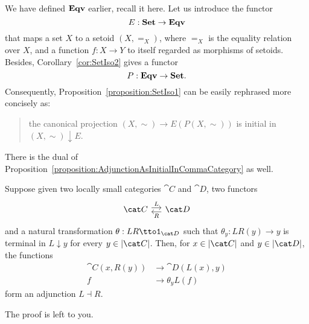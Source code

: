 \begin{example}
We have defined \(\mathbf{Eqv}\) earlier, recall it here. Let us introduce the functor
\[E : \mathbf{Set} \to \mathbf{Eqv}\]
that maps a set \(X\) to a setoid \((X, =_X)\), where \(=_X\) is the equality relation over \(X\), and a function \(f : X \to Y\) to itself regarded as morphisms of setoids. Besides, Corollary~\ref{cor:SetIso2} gives a functor
\[P : \mathbf{Eqv} \to \mathbf{Set} .\]
Consequently, Proposition~\ref{proposition:SetIso1} can be easily rephrased more concisely as:
\begin{quotation}
the canonical projection \((X, \sim) \to E(P(X, \sim))\) is initial in \((X, \sim) \downarrow E\).
\end{quotation}
\end{example}

There is the dual of Proposition~\ref{proposition:AdjunctionAsInitialInCommaCategory} as well.

\begin{proposition}\label{proposition:AdjunctionAsTerminalInCommaCategory}
Suppose given two locally small categories \(\cat C\) and \(\cat D\), two functors
\[\begin{tikzcd}[column sep=small]
\cat C \ar["L", r, shift left] & \cat D \ar["R", l, shift left]
\end{tikzcd}\]
and a natural transformation \(\theta : LR \tto \id_{\cat D}\) such that \(\theta_y : LR(y) \to y\) is terminal in \(L {\downarrow} y\) for every \(y \in \obj{\cat C}\).  Then, for \(x \in \obj{\cat C}\) and \(y \in \obj{\cat D}\), the functions
\begin{align*}
\cat C(x, R(y)) & \to \cat D(L(x), y) \\
f &\to \theta_y L(f)
\end{align*}
form an adjunction \(L \dashv R\).
\end{proposition}

\begin{exercise}
The proof is left to you.
\end{exercise}

\begin{example}
\YetToBeTeXed
\end{example}
